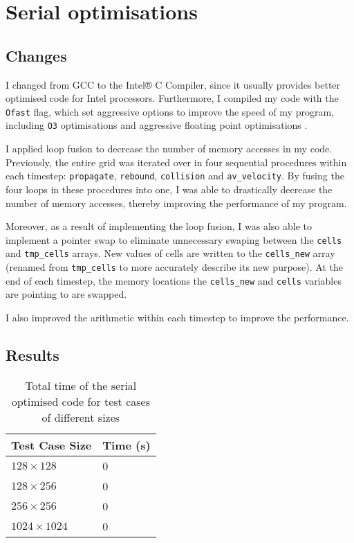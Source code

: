 \documentclass[11pt, twocolumn, a4paper]{article}
\begin{document}
\section{Serial optimisations}

\subsection{Changes}

I changed from GCC to the Intel® C Compiler, since it usually provides better optimised code for Intel processors.
Furthermore, I compiled my code with the \texttt{Ofast} flag, which set aggressive options to improve the speed of my program, including \texttt{O3} optimisations and aggressive floating point optimisations \cite{icc}.

I applied loop fusion to decrease the number of memory accesses in my code.
Previously, the entire grid was iterated over in four sequential procedures within each timestep: \texttt{propagate}, \texttt{rebound}, \texttt{collision} and \texttt{av\_velocity}.
By fusing the four loops in these procedures into one, I was able to drastically decrease the number of memory accesses, thereby improving the performance of my program.

Moreover, as a result of implementing the loop fusion, I was also able to implement a pointer swap to eliminate unnecessary swaping between the \texttt{cells} and \texttt{tmp\_cells} arrays.
New values of cells are written to the \texttt{cells\_new} array (renamed from \texttt{tmp\_cells} to more accurately describe its new purpose).
At the end of each timestep, the memory locations the \texttt{cells\_new} and \texttt{cells} variables are pointing to are swapped.

I also improved the arithmetic within each timestep to improve the performance.

\subsection{Results}

\begin{table}[htbp]
    \begin{center}
    \caption{Total time of the serial optimised code for test cases of different sizes}\label{tab:serial_optimised}
    \begin{tabular}{l | l} 
        \hline\hline
        Test Case Size&Time (s)\\
        \hline
        $128 \times 128$&0\\
        $128 \times 256$&0\\
        $256 \times 256$&0\\
        $1024 \times 1024$&0\\
        \hline
      \end{tabular}
    \end{center}
\end{table} 
\end{document}
